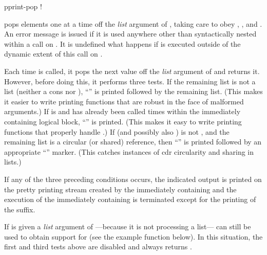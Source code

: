 \begin{defmac}
pprint-pop \!!

 pops elements one at a time off the {\it list} argument of
, taking care to obey ,
, and .  An error message is issued if it is
used anywhere other than syntactically nested within a call on
. It is undefined what happens if  is executed
outside of the dynamic extent of this call on .

Each time  is called, it pops the next value off the {\it
list} argument of  and returns it.  However,
before doing this, it performs three tests.  If the remaining list is not a
list (neither a cons nor ), ``'' is printed
followed by the remaining list.  (This makes it easier to write printing
functions that are robust in the face of malformed arguments.)  If
 is  and  has already been called
 times within the immediately containing logical block,
``'' is printed.  (This makes it easy to write printing functions
that properly handle .)  If  (and possibly also
) is not , and the remaining list is a circular
(or shared) reference, then ``'' is printed followed by an appropriate
``'' marker.  (This catches instances of cdr circularity and sharing
in lists.)

If any of the three preceding conditions occurs, the indicated output is
printed on the pretty printing stream created by the immediately containing
and the execution of the immediately containing
is terminated except for the printing of the suffix.

If  is given a {\it list} argument of
---because it is not processing a list--- can still
be used to obtain support for  (see the example function
 below).  In this situation, the first and third tests
above are disabled and  always returns .
\end{defmac}

